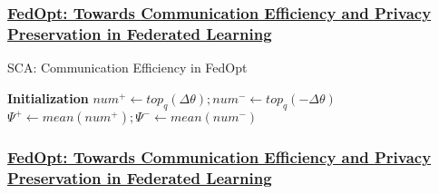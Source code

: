\documentclass{beamer}
\begin{document}
    \begin{frame}
        \frametitle{
            \href{https://www.mdpi.com/2076-3417/10/8/2864}{
            FedOpt: Towards Communication Efficiency and Privacy Preservation in Federated Learning
            }
        }

        \begin{algorithm}[H]
      
                        
            \caption{SCA: Communication Efficiency in FedOpt}
            \label{alg1}
            \textbf{Initialization}\;
            $ num^+ \leftarrow top_{q}(\Delta \theta); num^- \leftarrow top_{q}(- \Delta \theta) $ \\
            $ \Psi^+ \leftarrow mean(num^+); \Psi^- \leftarrow mean(num^-) $ \\
            \If{ $ \Psi^+ \le $ }{}
        \end{algorithm}
    
    \end{frame}

    \begin{frame}
        \frametitle{
            \href{https://www.mdpi.com/2076-3417/10/8/2864}{
            FedOpt: Towards Communication Efficiency and
            Privacy Preservation in Federated Learning
            }
        }
        
        
    
    \end{frame}
\end{document}
